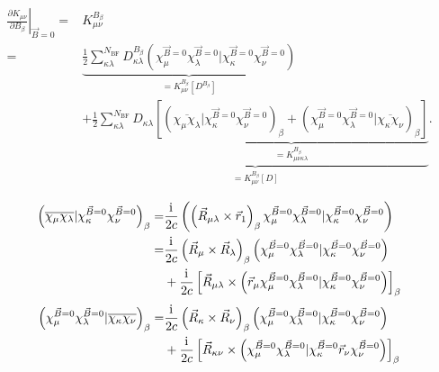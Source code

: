 	\begin{equation}
	\begin{aligned}
	\left.\frac{\partial K_{\mu\nu}}{\partial B_\beta}\right\vert_{\vec{B}=0}=&K_{\mu\nu}^{B_\beta}\\
	=&\underbrace{\frac{1}{2}\sum_{\kappa\lambda}^{N_{\textrm{BF}}}D_{\kappa\lambda}^{B_\beta} \left(\chi_\mu^{\vec{B}=0}\chi_\lambda^{\vec{B}=0}\vert\chi_\kappa^{\vec{B}=0}\chi_\nu^{\vec{B}=0}\right)}_{=K_{\mu\nu}^{B_\beta}[D^{B_\beta}]}\\
	&\underbrace{+\frac{1}{2}\sum_{\kappa\lambda}^{N_{\textrm{BF}}}D_{\kappa\lambda} \underbrace{\left[\left(\overline{\chi_\mu\chi_\lambda}\vert\chi_\kappa^{\vec{B}=0}\chi_\nu^{\vec{B}=0}\right)_\beta+\left(\chi_\mu^{\vec{B}=0}\chi_\lambda^{\vec{B}=0}\vert\overline{\chi_\kappa\chi_\nu}\right)_\beta\right]}_{=K_{\mu\nu\kappa\lambda}^{B_\beta}}}_{=K_{\mu\nu}^{B_\beta}[D]}.
	\end{aligned}
	\end{equation}
	
	\begin{equation}
	\begin{aligned}
	\left(\overline{\chi_\mu\chi_\lambda}\vert\chi_\kappa^{\vec{B}=0}\chi_\nu^{\vec{B}=0}\right)_\beta=&\frac{\mathrm{i}\mkern1mu}{2c} \left(\left(\vec{R}_{\mu\lambda}\times\vec{r}_1\right)_\beta\chi_\mu^{\vec{B}=0}\chi_\lambda^{\vec{B}=0}\vert\chi_\kappa^{\vec{B}=0}\chi_\nu^{\vec{B}=0}\right)\\
	=&\frac{\mathrm{i}\mkern1mu}{2c}\left(\vec{R}_\mu\times\vec{R}_\lambda\right)_\beta\left(\chi_\mu^{\vec{B}=0}\chi_\lambda^{\vec{B}=0}\vert\chi_\kappa^{\vec{B}=0}\chi_\nu^{\vec{B}=0}\right)\\
	&+\frac{\mathrm{i}\mkern1mu}{2c}\left[\vec{R}_{\mu\lambda}\times\left(\vec{r}_\mu\chi_\mu^{\vec{B}=0}\chi_\lambda^{\vec{B}=0}\vert\chi_\kappa^{\vec{B}=0}\chi_\nu^{\vec{B}=0}\right)\right]_\beta
	\end{aligned}
	\end{equation}
		\begin{equation}
	\begin{aligned}
	\left(\chi_\mu^{\vec{B}=0}\chi_\lambda^{\vec{B}=0}\vert\overline{\chi_\kappa\chi_\nu}\right)_\beta=&\frac{\mathrm{i}\mkern1mu}{2c}\left(\vec{R}_\kappa\times\vec{R}_\nu\right)_\beta\left(\chi_\mu^{\vec{B}=0}\chi_\lambda^{\vec{B}=0}\vert\chi_\kappa^{\vec{B}=0}\chi_\nu^{\vec{B}=0}\right)\\
	&+\frac{\mathrm{i}\mkern1mu}{2c}\left[\vec{R}_{\kappa\nu}\times\left(\chi_\mu^{\vec{B}=0}\chi_\lambda^{\vec{B}=0}\vert\chi_\kappa^{\vec{B}=0}\vec{r}_\nu\chi_\nu^{\vec{B}=0}\right)\right]_\beta
	\end{aligned}
	\end{equation}
	
